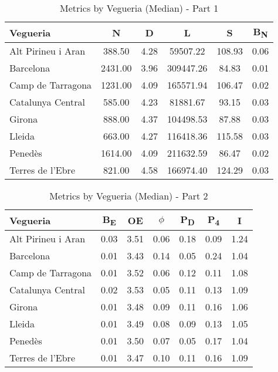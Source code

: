 \begin{table}[h!]
\centering
\begin{tabular}{lccccc}
\hline
Vegueria & \textbf{N} & \textbf{D} & \textbf{L} & \textbf{S} & \textbf{B\textsubscript{N}} \\
\hline
Alt Pirineu i Aran & 388.50 & 4.28 & 59507.22 & 108.93 & 0.06 \\
Barcelona & 2431.00 & 3.96 & 309447.26 & 84.83 & 0.01 \\
Camp de Tarragona & 1231.00 & 4.09 & 165571.94 & 106.47 & 0.02 \\
Catalunya Central & 585.00 & 4.23 & 81881.67 & 93.15 & 0.03 \\
Girona & 888.00 & 4.37 & 104498.53 & 87.88 & 0.03 \\
Lleida & 663.00 & 4.27 & 116418.36 & 115.58 & 0.03 \\
Penedès & 1614.00 & 4.09 & 211632.59 & 86.47 & 0.02 \\
Terres de l'Ebre & 821.00 & 4.58 & 166974.40 & 124.29 & 0.03 \\
\hline
\end{tabular}
\caption {Metrics by Vegueria (Median) - Part 1}
\end{table}

\begin{table}[h!]
\centering
\begin{tabular}{lcccccc}
\hline
Vegueria & \textbf{B\textsubscript{E}} & \textbf{OE} & \textbf{$\phi$} & \textbf{P\textsubscript{D}} & \textbf{P\textsubscript{4}} & \textbf{I} \\
\hline
Alt Pirineu i Aran & 0.03 & 3.51 & 0.06 & 0.18 & 0.09 & 1.24 \\
Barcelona & 0.01 & 3.43 & 0.14 & 0.05 & 0.24 & 1.04 \\
Camp de Tarragona & 0.01 & 3.52 & 0.06 & 0.12 & 0.11 & 1.08 \\
Catalunya Central & 0.02 & 3.53 & 0.05 & 0.11 & 0.13 & 1.09 \\
Girona & 0.01 & 3.48 & 0.09 & 0.11 & 0.16 & 1.06 \\
Lleida & 0.01 & 3.49 & 0.08 & 0.09 & 0.13 & 1.05 \\
Penedès & 0.01 & 3.50 & 0.07 & 0.05 & 0.17 & 1.04 \\
Terres de l'Ebre & 0.01 & 3.47 & 0.10 & 0.11 & 0.16 & 1.09 \\
\hline
\end{tabular}
\caption {Metrics by Vegueria (Median) - Part 2}
\end{table}

